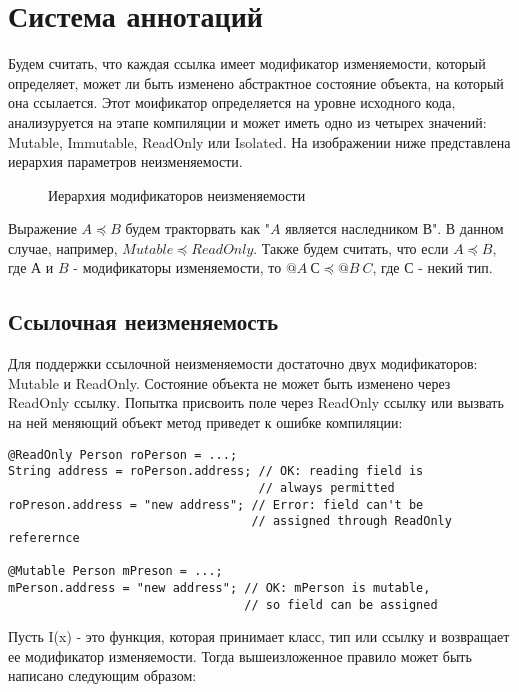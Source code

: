 \section{Система аннотаций}

Будем считать, что каждая ссылка имеет модификатор изменяемости, который определяет, может ли быть изменено абстрактное состояние объекта, на который она ссылается. Этот моификатор определяется на уровне исходного кода, анализуруется на этапе компиляции и может иметь одно из четырех значений: Mutable, Immutable, ReadOnly или Isolated. На изображении ниже представлена иерархия параметров неизменяемости. 

\begin{figure}[h]
\caption{Иерархия модификаторов неизменяемости}
\label{pic:my_classes}
\end{figure}

Выражение $A \preceq B$ будем тракторвать как "$A$ является наследником $В$". В данном случае, например, $Mutable \preceq ReadOnly$. Также будем считать, что если $A \preceq B$, где $А$ и $B$ - модификаторы изменяемости, то $@A\:С \preceq @B\:C$, где $С$ - некий тип.

\subsection{Ссылочная неизменяемость}

Для поддержки ссылочной неизменяемости достаточно двух модификаторов: Mutable и ReadOnly. Состояние объекта не может быть изменено через ReadOnly ссылку. Попытка присвоить поле через ReadOnly ссылку или вызвать на ней меняющий объект метод приведет к ошибке компиляции:

\begin{lstlisting}[caption=Mutable и RadOnly ссылки, label=code:mutable_vs_readonly]
@ReadOnly Person roPerson = ...;
String address = roPerson.address; // OK: reading field is 
                                   // always permitted
roPreson.address = "new address"; // Error: field can't be 
                                  // assigned through ReadOnly referernce

@Mutable Person mPreson = ...;
mPerson.address = "new address"; // OK: mPerson is mutable, 
                                 // so field can be assigned
\end{lstlisting} 

Пусть I(x) - это функция, которая принимает класс, тип или ссылку и возвращает ее модификатор изменяемости. Тогда вышеизложенное правило может быть написано следующим образом:

